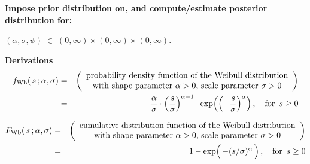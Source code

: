
\clearpage
\noindent
{\color{red}
\textbf{Impose prior distribution on, and compute/estimate posterior distribution for:}
\begin{center}
$(\alpha, \sigma, \psi) \;\in\; (0,\infty) \times (0,\infty) \times (0,\infty)$.
\end{center}
}


\vskip 0.5cm
\noindent
\textbf{Derivations}
\begin{eqnarray*}
f_{\textnormal{Wb}}(\,s\,;\alpha,\sigma)
& = &
	\left(\begin{array}{c}
		\textnormal{probability density function of the Weibull distribution}
		\\
		\textnormal{with shape parameter $\alpha > 0$, scale parameter $\sigma > 0$}
	\end{array}\right)
\\
& = &
	\dfrac{\alpha}{\sigma}\cdot\left(\dfrac{s}{\sigma}\right)^{\alpha-1}\cdot\exp\!\left(\left(-\dfrac{s}{\sigma}\right)^{\alpha}\right),
	\quad
	\textnormal{for \,$s \geq 0$}
\end{eqnarray*}


\begin{eqnarray*}
F_{\textnormal{Wb}}(\,s\,;\alpha,\sigma)
& = &
	\left(\begin{array}{c}
		\textnormal{cumulative distribution function of the Weibull distribution}
		\\
		\textnormal{with shape parameter $\alpha > 0$, scale parameter $\sigma > 0$}
	\end{array}\right)
\\
& = &
	1 - \exp\!\left(\,-(\overset{{\color{white}1}}{s}/\sigma)^{\alpha}\,\right),
	\quad
	\textnormal{for \,$s \geq 0$}
\end{eqnarray*}


